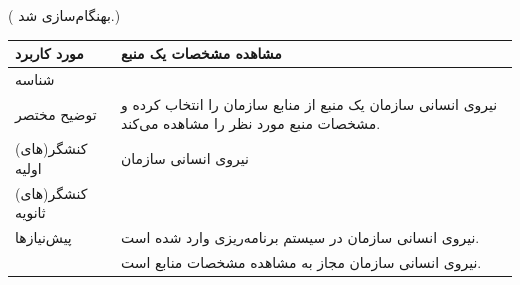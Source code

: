 ({\color{red} بهنگام‌سازی شد.})
\begin{table}[H]
	\centering
	\begin{tabular}{|p{3cm}|p{10cm}|}
		\hline
		
		مورد کاربرد	& مشاهده مشخصات یک منبع  \\
		\hline
		
		شناسه & 
		\stepcounter{usecase_ID}
		
		\arabic{usecase_ID} \\
		
		\hline
		
		توضیح مختصر & نیروی انسانی سازمان یک منبع از منابع سازمان را انتخاب کرده و مشخصات منبع مورد نظر را مشاهده می‌کند. \\
		\hline
		
		کنشگر(های) اولیه& نیروی انسانی سازمان  \\
		\hline
		
		کنشگر(های) ثانویه&  \\
		\hline
		
		پیش‌نیازها &
		نیروی انسانی سازمان در سیستم برنامه‌ریزی وارد شده است.\\
		& نیروی انسانی سازمان مجاز به مشاهده مشخصات منابع است. \\
		\hline
		

\end{tabular}
\end{table}
